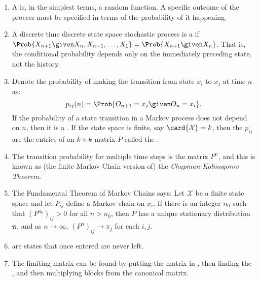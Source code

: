 \documentclass[12pt]{article}
\begin{document}
\begin{enumerate}
    \item
        A  is, in the simplest terms, a random
        function.  A specific outcome of the process must be specified
        in terms of the probability of it happening.
    \item
        A discrete time discrete state space stochastic process is a
         if \( \Prob{X_{n+1} \given X_n, X_{n-1},
        \dots, X_1} = \Prob{X_{n+1} \given X_n} \).  That is, the
        conditional probability depends only on the immediately
        preceding state, not the history.
    \item
        Denote the probability of making the transition from state \( x_i
        \) to \( x_j \) at time \( n \) as:
        \[
            p_{ij}(n)=\Prob{O_{n+1}=x_j \given O_{n}=x_i}.
        \] If the probability of a state transition in a Markov process
        does not depend on \( n \), then it is a .  If the state space is finite, say \( \card{\mathcal
        {X}} = k \), then the \( p_{ij} \) are the entries of an \( k
        \times k \) matrix \( P \) called the .
    \item
        The transition probability for multiple time steps is the matrix
        \( P^n \), and this is known as (the finite Markov Chain version
        of) the \textit{Chapman-Kolmogorov Theorem}.
    \item
        The Fundamental Theorem of Markov Chains says:  Let \( \mathcal{X}
        \) be a finite state space and let \( P_{ij} \) define a Markov
        chain on \( x_i \).  If there is an integer \( n_0 \) such that \(
        (P^{n_0})_{ij} > 0 \) for all \( n > n_0 \), then \( P \) has a
        unique stationary distribution \( \mathbf{\pi} \), and as \( n
        \to \infty \), \( (P^n)_{ij} \to \pi_{j} \) for each \( i,j \).
    \item
         are states that once entered are never
        left.
    \item
        The limiting matrix can be found by putting the matrix in , then finding the , and then
        multiplying blocks from the canonical matrix.
\end{enumerate}

\hr

\end{document}
